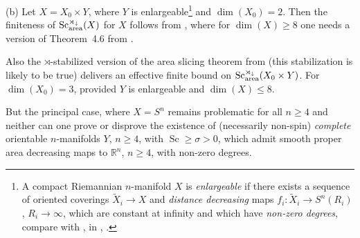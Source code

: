 \documentclass[pdftex]{sigma}
\numberwithin{equation}{section}
\begin{document}
 (b) Let $X=X_0\times Y$, where $Y$ is
 enlargeable\footnote{A compact Riemannian $n$-manifold $X$ is \emph{enlargeable} if there exists a sequence of oriented coverings
 $\tilde X_i\to X$ and {\it distance decreasing} maps
 $f_i\colon \tilde X_i\to S^n(R_i)$, $R_i\to \infty$, which are constant at infinity and which have {\it non-zero degrees}, compare with \cite{BH2009, GL1980, HKRS, SY1979}, in \cite[\S4.7]{Gr2021}, \cite[\S2.A]{Gr2023}.} and $\dim(X_0)=2$.
Then the finiteness of $\operatorname{Sc}_{\rm area}^{\rtimes_\downarrow}(X)$ for $X$ follows from \cite{Zhu2020}, where for $\dim(X)\geq 8$ one needs a version of Theorem~4.6 from \cite{SY2017}.

Also the
 $\rtimes$-stabilized version of the area slicing theorem from \cite{LM2021} (this stabilization is likely to be true) delivers an effective finite bound on $\operatorname{Sc}_{\rm area}^{\rtimes_\downarrow}(X_0\times Y)$.
For $\dim(X_0) =3$, provided $Y$ is enlargeable and $\dim(X)\leq 8$.

 But the principal case, where $X=S^n$ remains problematic for all $n\geq 4$
 and neither can one prove or disprove the existence of (necessarily non-spin) {\it complete} orientable $n$-manifolds $Y$, $n\geq 4$, with $\operatorname{Sc}\geq \sigma>0$,
which admit smooth proper area decreasing maps to $\mathbb R^n$, $n\geq 4$, with non-zero degrees.
\end{document}
